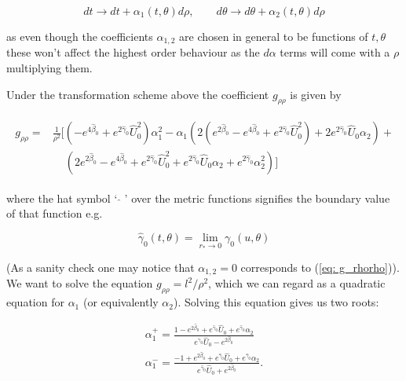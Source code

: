 \documentclass[a4paper,11pt]{article}
\numberwithin{equation}{section}
\begin{document}
\begin{equation}
dt \rightarrow dt+ \alpha_1(t,\theta) d\rho, \qquad d\theta \rightarrow d\theta + \alpha_2(t,\theta) d\rho 
\end{equation}

\noindent as even though the coefficients $\alpha_{1,2}$ are chosen in general to be functions of $t,\theta$ these won't affect the highest order behaviour as the $d\alpha$ terms will come with a $\rho$ multiplying them. \par

\noindent Under the transformation scheme above the coefficient $g_{\rho \rho}$ is given by 

\begin{align}
\begin{split}
g_{\rho \rho}=&\frac{1}{\rho^2}[(-e^{4\hat{\beta}_{0}}+e^{2\hat{\gamma}_{0}}\hat{U}_{0}^2)\alpha_1^2-\alpha_1(2(e^{2\hat{\beta}_{0}}-e^{4\hat{\beta}_{0}}+e^{2\hat{\gamma}_{0}}\hat{U}_{0}^2)+2e^{2\hat{\gamma}_{0}}\hat{U}_{0}\alpha_2) + \\ 
&\phantom{\frac{1}{4\rho^2}}(2e^{2\hat{\beta}_{0}}-e^{4\hat{\beta}_{0}}+e^{2\hat{\gamma}_{0}}\hat{U}_{0}^2+e^{2\hat{\gamma}_{0}}\hat{U}_{0}\alpha_2+e^{2\hat{\gamma}_{0}}\alpha_2^2)]
\end{split}
\end{align}

\noindent where the hat symbol  ` $\hat{}$ ' over the metric  functions signifies the boundary value of that function e.g. 

\begin{equation} \label{eq: tortoise_limit}
\hat{\gamma}_0(t,\theta)=\lim_{r_* \rightarrow 0} \gamma_0(u,\theta)
\end{equation}

\noindent (As a sanity check one may notice that $\alpha_{1,2}=0$ corresponds to (\ref{eq: g_rhorho})). We want to solve the equation $g_{\rho \rho}=l^2/\rho^2$, which we can regard as a quadratic equation for $\alpha_1$ (or equivalently $\alpha_2$). Solving this equation gives us two roots:

\begin{subequations}
\begin{align}
\alpha_1^+=\frac{1-e^{2\hat{\beta}_{0}}+e^{\hat{\gamma}_{0}}\hat{U}_{0}+e^{\hat{\gamma}_{0}}\alpha_2}{e^{\gamma_{0}}\hat{U}_{0}-e^{2\hat{\beta}_{0}}} \\
\alpha_1^-=\frac{-1+e^{2\hat{\beta}_{0}}+e^{\hat{\gamma}_{0}}\hat{U}_{0}+e^{\hat{\gamma}_{0}}\alpha_2}{e^{\hat{\gamma}_{0}}\hat{U}_{0}+e^{2\hat{\beta}_{0}}}.
\end{align}
\end{subequations}
\end{document}
